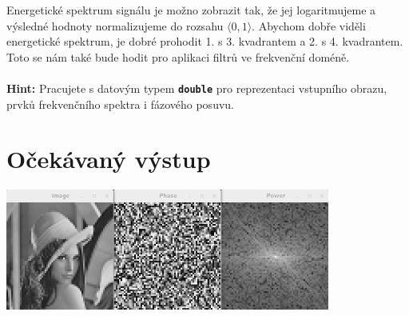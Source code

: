 \documentclass[12pt]{article}
\begin{document}
Energetické spektrum signálu je možno zobrazit tak, že jej logaritmujeme a výsledné hodnoty normalizujeme do rozsahu $\langle 0, 1\rangle$. Abychom dobře viděli energetické spektrum, je dobré prohodit 1. s 3. kvadrantem a 2. s 4. kvadrantem. Toto se nám také bude hodit pro aplikaci filtrů ve frekvenční doméně.
\\
\\
\textbf{Hint:} Pracujete s datovým typem \textbf{\texttt{double}} pro reprezentaci vstupního obrazu, prvků frekvenčního spektra i fázového posuvu.

\section*{Očekávaný výstup}

\begin{center}
\includegraphics[width=0.8\textwidth]{result_images.png}
\end{center}
\end{document}
